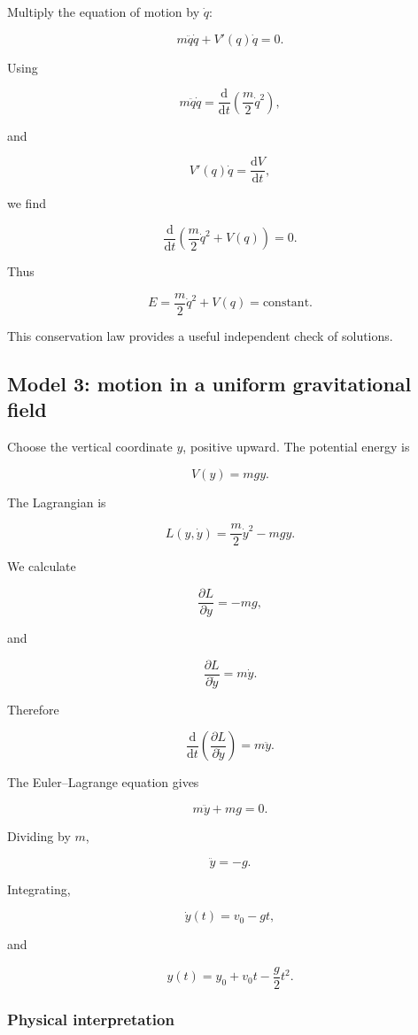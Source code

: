 Multiply the equation of motion by \(\dot q\):

\[
m\ddot q\dot q
+
V'(q)\dot q
=0.
\]

Using

\[
m\ddot q\dot q
=
\frac{\mathrm{d}}{\mathrm{d}t}
\left(
\frac{m}{2}\dot q^{2}
\right),
\]

and

\[
V'(q)\dot q
=
\frac{\mathrm{d}V}{\mathrm{d}t},
\]

we find

\[
\frac{\mathrm{d}}{\mathrm{d}t}
\left(
\frac{m}{2}\dot q^{2}+V(q)
\right)
=0.
\]

Thus

\[
\boxed{
E
=
\frac{m}{2}\dot q^{2}+V(q)
=
\text{constant}
}.
\]

This conservation law provides a useful independent check of solutions.

\subsection{Model 3: motion in a uniform gravitational field}

Choose the vertical coordinate \(y\), positive upward. The potential energy is

\[
V(y)=mgy.
\]

The Lagrangian is

\[
L(y,\dot y)
=
\frac{m}{2}\dot y^{2}-mgy.
\]

We calculate

\[
\frac{\partial L}{\partial y}
=
-mg,
\]

and

\[
\frac{\partial L}{\partial\dot y}
=
m\dot y.
\]

Therefore

\[
\frac{\mathrm{d}}{\mathrm{d}t}
\left(
\frac{\partial L}{\partial\dot y}
\right)
=
m\ddot y.
\]

The Euler--Lagrange equation gives

\[
m\ddot y+mg=0.
\]

Dividing by \(m\),

\[
\boxed{
\ddot y=-g
}.
\]

Integrating,

\[
\dot y(t)=v_{0}-gt,
\]

and

\[
\boxed{
y(t)=y_{0}+v_{0}t-\frac{g}{2}t^{2}
}.
\]

\subsubsection{Physical interpretation}

